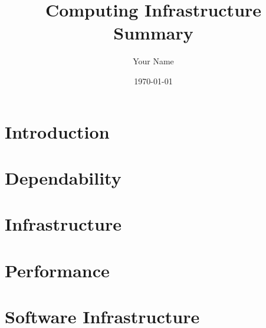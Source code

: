 \documentclass{report}
\title{Computing Infrastructure Summary}
\author{Your Name}
\date{\today}
\begin{document}
\maketitle

\tableofcontents
\newpage

\part{Introduction}


\part{Dependability}



\part{Infrastructure}












\part{Performance}




\part{Software Infrastructure}



\end{document}
